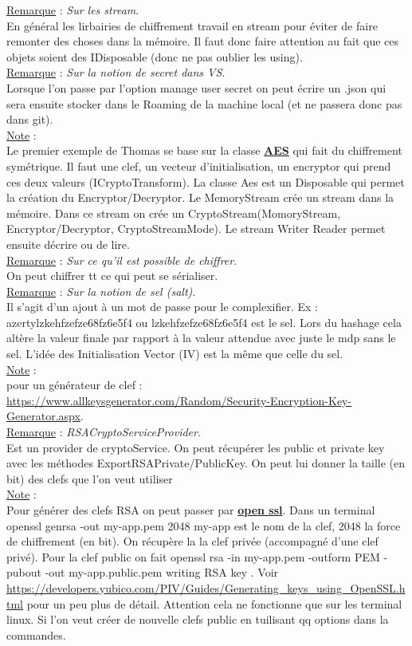 \documentclass[a4paper,12pt,twoside]{article}
\newcommand{\urlcolor}{magenta}  %
\newcommand{\keycolor}{purple} %
\newcommand{\incode}[1]{{\footnotesize\ttfamily #1}} %
\newcommand{\rem}[2]{\noindent\underline{Remarque} : \textit{#1}.\\ \indent #2}
\newcommand{\note}[1]{\noindent\underline{Note} : \\ \indent #1}
\newcommand{\keyref}[2]{\hypersetup{urlcolor=\keycolor} \href{#1}{\textbf{#2}}\hypersetup{urlcolor=\urlcolor}}
\begin{document}
{{\rem{Sur les stream}{En général les lirbairies de chiffrement travail en stream pour éviter de faire remonter des choses dans la mémoire. Il faut donc faire attention au fait que ces objets soient des IDisposable (donc ne pas oublier les using).}\\

\rem{Sur la notion de secret dans VS}{Lorsque l'on passe par l'option manage user secret on peut écrire un .json qui sera ensuite stocker dans le Roaming de la machine local (et ne passera donc pas dans git).}\\

\note{Le premier exemple de Thomas se base sur la classe \keyref{https://docs.microsoft.com/en-us/dotnet/api/system.security.cryptography.aes?view=net-6.0}{AES} qui fait du chiffrement symétrique. Il faut une clef, un vecteur d'initialisation, un encryptor qui prend ces deux valeurs (ICryptoTransform). La classe Aes est un Disposable qui permet la création du Encryptor/Decryptor. Le MemoryStream crée un stream dans la mémoire. Dans ce stream on crée un CryptoStream(MomoryStream, Encryptor/Decryptor, CryptoStreamMode). Le stream Writer Reader permet ensuite décrire ou de lire.}\\

\rem{Sur ce qu'il est possible de chiffrer}{On peut chiffrer tt ce qui peut se sérialiser.}\\

\rem{Sur la notion de sel (salt)}{Il s'agit d'un ajout à un mot de passe pour le complexifier. Ex : azertylzkehfzefze68fz6e5f4 ou lzkehfzefze68fz6e5f4 est le sel. Lors du hashage cela altère la valeur finale par rapport à la valeur attendue avec juste le mdp sans le sel. L'idée des Initialisation Vector (IV) est la même que celle du sel.}\\

\note{pour un générateur de clef : \url{https://www.allkeysgenerator.com/Random/Security-Encryption-Key-Generator.aspx}.}\\

\rem{RSACryptoServiceProvider}{Est un provider de cryptoService. On peut récupérer les public et private key avec les méthodes ExportRSAPrivate/PublicKey. On peut lui donner la taille (en bit) des clefs que l'on veut utiliser}\\

\note{Pour générer des clefs RSA on peut passer par \keyref{https://www.openssl.org/}{open ssl}. Dans un terminal \incode{openssl genrsa -out my-app.pem 2048} my-app est le nom de la clef, 2048 la force de chiffrement (en bit). On récupère la la clef privée (accompagné d'une clef privé). Pour la clef public on fait \incode{openssl rsa -in my-app.pem -outform PEM -pubout -out my-app.public.pem
writing RSA key} . Voir \url{https://developers.yubico.com/PIV/Guides/Generating_keys_using_OpenSSL.html} pour un peu plus de détail. Attention cela ne fonctionne que sur les terminal linux. Si l'on veut créer de nouvelle clefs public en tuilisant qq options dans la commandes.}\\

}}
\end{document}
